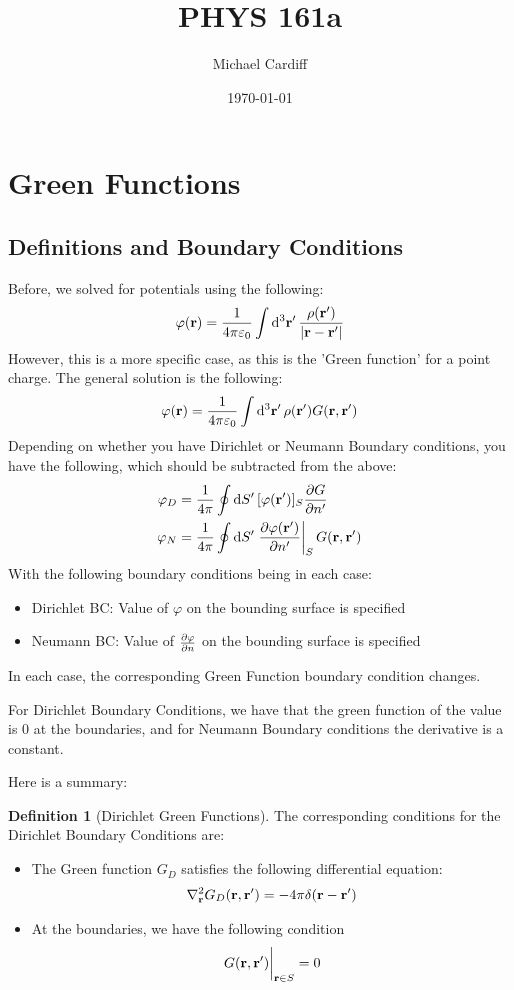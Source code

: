 \documentclass[12pt]{article}
\title{\vspace{-3em}PHYS 161a}
\author{Michael Cardiff}
\date{\today}
\theoremstyle{plain}
\theoremstyle{definition}
\newtheorem{definition}{Definition}[section]
\renewcommand{\k}{\frac1{4\pi\varepsilon_0}}
\let\temp\phi
\let\phi\varphi
\let\varphi\temp
\begin{document}
\maketitle
\section{Green Functions}
\subsection{Definitions and Boundary Conditions}
Before, we solved for potentials using the following:
\begin{align*}
  \phi(\vb{r})=\k\int\dd[3]{\vb{r}'}\frac{\rho(\vb{r'})}{\abs{\vb{r-r}'}}
\end{align*}
However, this is a more specific case, as this is the 'Green function' for a point charge. The general solution is the following:
\begin{align*}
  \phi(\vb{r})=\k\int\dd[3]{\vb{r}'}\rho(\vb{r}')G(\vb{r,r}')
\end{align*}
Depending on whether you have Dirichlet or Neumann Boundary conditions, you have the following, which should be subtracted from the above:
\begin{align*}
  \phi_D&=\frac1{4\pi}\oint\dd{S'}[\phi(\vb{r}')]_S\pdv{G}{n'}(\vb{r,r}')\\
  \phi_N&=\frac1{4\pi}\oint\dd{S'}\eval{\pdv{\phi(\vb{r}')}{n'}}_SG(\vb{r,r}')
\end{align*}
With the following boundary conditions being in each case:
\begin{itemize}
\item Dirichlet BC: Value of $\phi$ on the bounding surface is specified
\item Neumann BC: Value of $\pdv{\phi}{n}$ on the bounding surface is specified
\end{itemize}
In each case, the corresponding Green Function boundary condition changes.

For Dirichlet Boundary Conditions, we have that the green function of the value is $0$ at the boundaries, and for Neumann Boundary conditions the derivative is a constant.

Here is a summary:
\begin{definition}[Dirichlet Green Functions]
  The corresponding conditions for the Dirichlet Boundary Conditions are:
  \begin{itemize}
  \item The Green function $G_D$ satisfies the following differential equation:
    \begin{align*}
      \laplacian_{\vb{r}}G_D(\vb{r,r}')=-4\pi\delta(\vb{r-r}')
    \end{align*}
  \item At the boundaries, we have the following condition
    \begin{align*}
      \eval{G(\vb{r,r}')}_{\vb{r}\in S}=0
    \end{align*}
  \end{itemize}
\end{definition}
\end{document}
